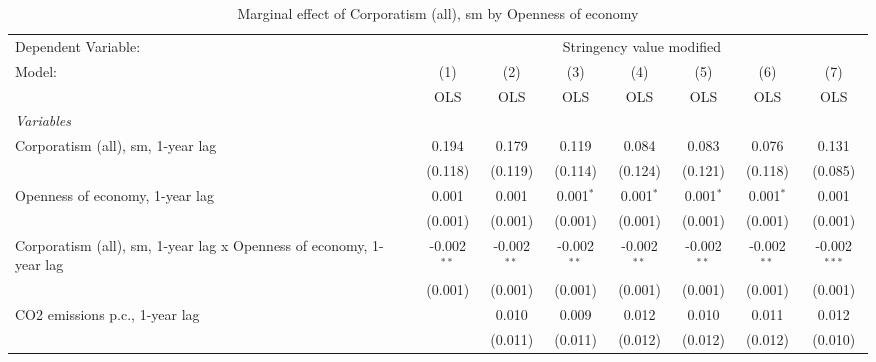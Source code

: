 
\begin{table}[htbp]
   \caption{Marginal effect of Corporatism (all), sm by Openness of economy}
   \centering
   \begin{tabular}{lccccccc}
      \toprule
      Dependent Variable: & \multicolumn{7}{c}{Stringency value modified}\\
      Model:                                                              & (1)           & (2)           & (3)           & (4)           & (5)           & (6)           & (7)\\  
                                                                          &  OLS          & OLS           & OLS           & OLS           & OLS           & OLS           & OLS\\  
      \midrule
      \emph{Variables}\\
      Corporatism (all), sm, 1-year lag                                   & 0.194         & 0.179         & 0.119         & 0.084         & 0.083         & 0.076         & 0.131\\   
                                                                          & (0.118)       & (0.119)       & (0.114)       & (0.124)       & (0.121)       & (0.118)       & (0.085)\\   
      Openness of economy, 1-year lag                                     & 0.001         & 0.001         & 0.001$^{*}$   & 0.001$^{*}$   & 0.001$^{*}$   & 0.001$^{*}$   & 0.001\\   
                                                                          & (0.001)       & (0.001)       & (0.001)       & (0.001)       & (0.001)       & (0.001)       & (0.001)\\   
      Corporatism (all), sm, 1-year lag x Openness of economy, 1-year lag & -0.002$^{**}$ & -0.002$^{**}$ & -0.002$^{**}$ & -0.002$^{**}$ & -0.002$^{**}$ & -0.002$^{**}$ & -0.002$^{***}$\\   
                                                                          & (0.001)       & (0.001)       & (0.001)       & (0.001)       & (0.001)       & (0.001)       & (0.001)\\   
      CO2 emissions p.c., 1-year lag                                      &               & 0.010         & 0.009         & 0.012         & 0.010         & 0.011         & 0.012\\   
                                                                          &               & (0.011)       & (0.011)       & (0.012)       & (0.012)       & (0.012)       & (0.010)\\   

\end{tabular}
\end{table}
